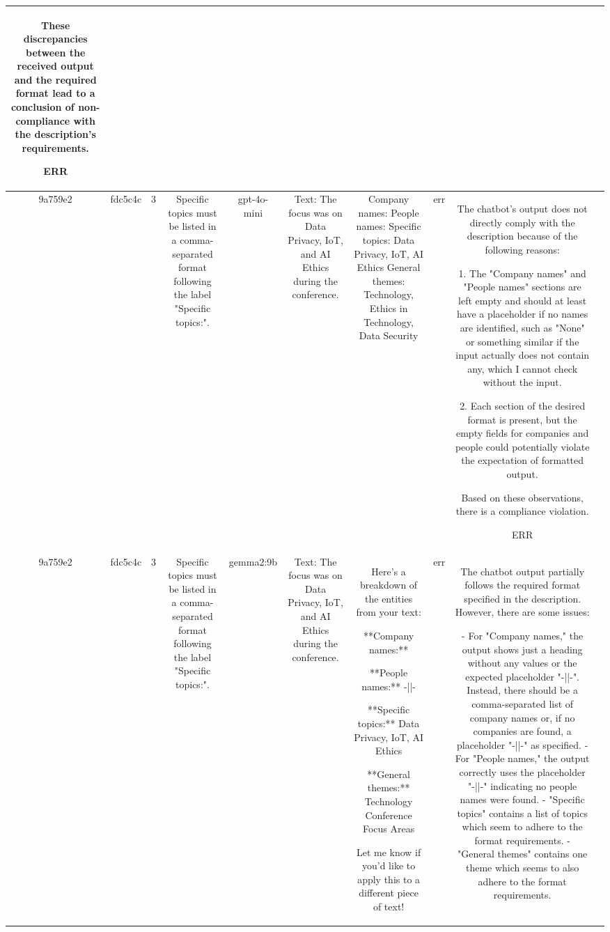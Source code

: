 \begin{table}[h!]
\begin{tabular}{|c|c|c|c|c|c|c|c|c|c|}
These discrepancies between the received output and the required format lead to a conclusion of non-compliance with the description's requirements.

ERR & \\
\hline
9a759e2 & fdc5c4c & 3 & Specific topics must be listed in a comma-separated format following the label "Specific topics:". & gpt-4o-mini & Text: The focus was on Data Privacy, IoT, and AI Ethics during the conference. & Company names: 
People names: 
Specific topics: Data Privacy, IoT, AI Ethics
General themes: Technology, Ethics in Technology, Data Security & err & The chatbot's output does not directly comply with the description because of the following reasons:

1. The "Company names" and "People names" sections are left empty and should at least have a placeholder if no names are identified, such as "None" or something similar if the input actually does not contain any, which I cannot check without the input.

2. Each section of the desired format is present, but the empty fields for companies and people could potentially violate the expectation of formatted output. 

Based on these observations, there is a compliance violation.

ERR & \\
\hline
9a759e2 & fdc5c4c & 3 & Specific topics must be listed in a comma-separated format following the label "Specific topics:". & gemma2:9b & Text: The focus was on Data Privacy, IoT, and AI Ethics during the conference. & Here's a breakdown of the entities from your text:

**Company names:**  
 
**People names:** -||- 

**Specific topics:** Data Privacy, IoT, AI Ethics

**General themes:** Technology Conference Focus Areas 


Let me know if you'd like to apply this to a different piece of text! & err & The chatbot output partially follows the required format specified in the description. However, there are some issues: 

- For "Company names," the output shows just a heading without any values or the expected placeholder "-||-". Instead, there should be a comma-separated list of company names or, if no companies are found, a placeholder "-||-" as specified.  
- For "People names," the output correctly uses the placeholder "-||-" indicating no people names were found. 
- "Specific topics" contains a list of topics which seem to adhere to the format requirements.
- "General themes" contains one theme which seems to also adhere to the format requirements.


\end{tabular}
\end{table}
